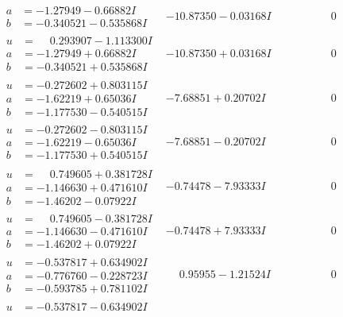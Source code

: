 \documentclass[1p]{elsarticle_modified}
\theoremstyle{definition}
\begin{document}
$$\begin{array}{c|c|c}
\begin{aligned}
a &= -1.27949 - 0.66882 I \\
b &= -0.340521 - 0.535868 I\end{aligned}
 & -10.87350 - 0.03168 I & \phantom{-0.000000 } 0 \\ \hline\begin{aligned}
u &= \phantom{-}0.293907 - 1.113300 I \\
a &= -1.27949 + 0.66882 I \\
b &= -0.340521 + 0.535868 I\end{aligned}
 & -10.87350 + 0.03168 I & \phantom{-0.000000 } 0 \\ \hline\begin{aligned}
u &= -0.272602 + 0.803115 I \\
a &= -1.62219 + 0.65036 I \\
b &= -1.177530 - 0.540515 I\end{aligned}
 & -7.68851 + 0.20702 I & \phantom{-0.000000 } 0 \\ \hline\begin{aligned}
u &= -0.272602 - 0.803115 I \\
a &= -1.62219 - 0.65036 I \\
b &= -1.177530 + 0.540515 I\end{aligned}
 & -7.68851 - 0.20702 I & \phantom{-0.000000 } 0 \\ \hline\begin{aligned}
u &= \phantom{-}0.749605 + 0.381728 I \\
a &= -1.146630 + 0.471610 I \\
b &= -1.46202 - 0.07922 I\end{aligned}
 & -0.74478 - 7.93333 I & \phantom{-0.000000 } 0 \\ \hline\begin{aligned}
u &= \phantom{-}0.749605 - 0.381728 I \\
a &= -1.146630 - 0.471610 I \\
b &= -1.46202 + 0.07922 I\end{aligned}
 & -0.74478 + 7.93333 I & \phantom{-0.000000 } 0 \\ \hline\begin{aligned}
u &= -0.537817 + 0.634902 I \\
a &= -0.776760 - 0.228723 I \\
b &= -0.593785 + 0.781102 I\end{aligned}
 & \phantom{-}0.95955 - 1.21524 I & \phantom{-0.000000 } 0 \\ \hline\begin{aligned}
u &= -0.537817 - 0.634902 I \\

\end{aligned}
\end{array}$$
\end{document}
